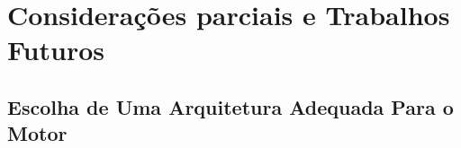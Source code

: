 \chapter{Considera\c{c}\~oes parciais e Trabalhos Futuros}


\section{Escolha de Uma Arquitetura Adequada Para o Motor}
